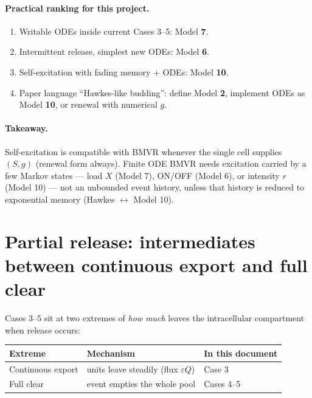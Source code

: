 \documentclass[11pt,a4paper]{article}
\theoremstyle{plain}
\theoremstyle{definition}
\theoremstyle{remark}
\begin{document}
\paragraph{Practical ranking for this project.}
\begin{enumerate}
\item Writable ODEs inside current Cases 3--5: Model \textbf{7}.
\item Intermittent release, simplest new ODEs: Model \textbf{6}.
\item Self-excitation with fading memory $+$ ODEs: Model \textbf{10}.
\item Paper language ``Hawkes-like budding'': define Model \textbf{2},
implement ODEs as Model \textbf{10}, or renewal with numerical $g$.
\end{enumerate}

\paragraph{Takeaway.}
Self-excitation is compatible with BMVR whenever the single cell supplies
$(S,g)$ (renewal form always). Finite ODE BMVR needs excitation carried by a
few Markov states --- load $X$ (Model 7), ON/OFF (Model 6), or intensity $r$
(Model 10) --- not an unbounded event history, unless that history is reduced
to exponential memory (Hawkes $\leftrightarrow$ Model 10).

\section{Partial release: intermediates between continuous export and full clear}
\label{sec:partial-release}

Cases 3--5 sit at two extremes of \emph{how much} leaves the intracellular
compartment when release occurs:

\begin{center}
\renewcommand{\arraystretch}{1.2}
\begin{tabular}{@{}lll@{}}
\toprule
Extreme & Mechanism & In this document \\
\midrule
Continuous export & units leave steadily (flux $\varepsilon Q$) & Case 3 \\
Full clear & event empties the whole pool & Cases 4--5 \\
\bottomrule
\end{tabular}
\end{center}
\end{document}
